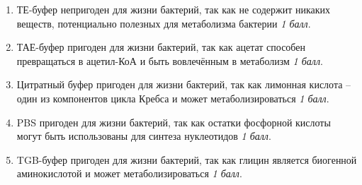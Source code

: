 \solutionSection

\begin{enumerate}
    \item ТЕ-буфер непригоден для жизни бактерий, так как не содержит никаких веществ, потенциально полезных для метаболизма бактерии \textit{1 балл}.
    \item ТАЕ-буфер пригоден для жизни бактерий, так как ацетат способен превращаться в ацетил-КоА и быть вовлечённым в метаболизм \textit{1 балл}.
    \item Цитратный буфер пригоден для жизни бактерий, так как лимонная кислота – один из компонентов цикла Кребса и может метаболизироваться \textit{1 балл}.
    \item PBS пригоден для жизни бактерий, так как остатки фосфорной кислоты могут быть использованы для синтеза нуклеотидов \textit{1 балл}.
    \item TGB-буфер пригоден для жизни бактерий, так как глицин является биогенной аминокислотой и может метаболизироваться \textit{1 балл}.
\end{enumerate}